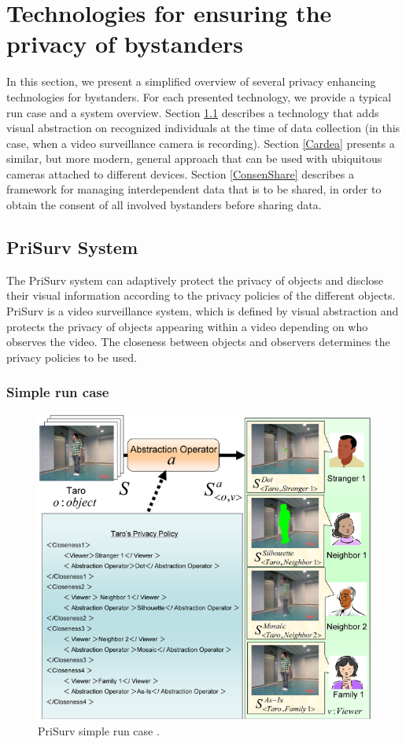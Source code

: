 \documentclass[conference]{IEEEtran}
\begin{document}
\section{Technologies for ensuring the privacy of bystanders}\label{Technologies}
In this section, we present a simplified overview of several privacy enhancing technologies for bystanders. For each presented technology, we provide a typical run case and a system overview. Section \ref{PrivSurv} describes a technology that adds visual abstraction on recognized individuals at the time of data collection (in this case, when a video surveillance camera is recording).  Section \ref{Cardea} presents a similar, but more modern, general approach that can be used with ubiquitous cameras attached to different devices. Section \ref{ConsenShare} describes a framework for managing interdependent data that is to be shared, in order to obtain the consent of all involved bystanders before sharing data.

\subsection{PriSurv System}\label{PrivSurv}
The PriSurv system \cite{chinomi2008PriSurv} can adaptively protect the privacy of objects and disclose their visual information according to the privacy policies of the different objects. PriSurv is a video surveillance system, which is defined by visual abstraction and protects the privacy of objects appearing within a video depending on who observes the video. The closeness between objects and observers determines the privacy policies to be used. 

\subsubsection{Simple run case}

\begin{figure}[t]
\centerline{\includegraphics[width=.5\textwidth]{img//prisurv_simple_demo.png}}
\caption{PriSurv simple run case \cite{chinomi2008PriSurv}.}
\label{fig:prisurv}
\end{figure}
\end{document}
